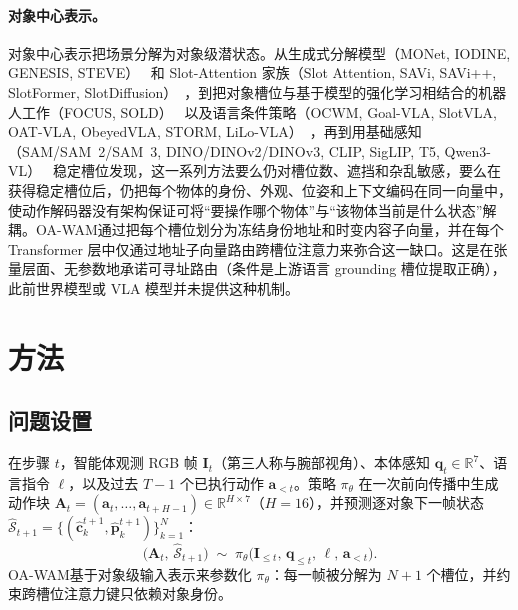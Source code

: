 \documentclass{article}
\newcommand{\method}{OA-WAM}
\begin{document}
\paragraph{对象中心表示。}
对象中心表示把场景分解为对象级潜状态。从生成式分解模型（MONet, IODINE, GENESIS, STEVE）~\citep{monet,iodine,genesis,steve} 和 Slot-Attention 家族（Slot Attention, SAVi, SAVi++, SlotFormer, SlotDiffusion）~\citep{slotattention,savi,savipp,slotformer,slotdiffusion}，到把对象槽位与基于模型的强化学习相结合的机器人工作（FOCUS, SOLD）~\citep{focus,sold} 以及语言条件策略（OCWM, Goal-VLA, SlotVLA, OAT-VLA, ObeyedVLA, STORM, LiLo-VLA）~\citep{ocwm,goalvla,slotvla,oatvla,obeyedvla,storm,lilovla}，再到用基础感知（SAM/SAM~2/SAM~3, DINO/DINOv2/DINOv3, CLIP, SigLIP, T5, Qwen3-VL）~\citep{sam,sam2,sam3,dino,dinov2,dinov3,clip,siglip,t5,qwen3vl} 稳定槽位发现，这一系列方法要么仍对槽位数、遮挡和杂乱敏感，要么在获得稳定槽位后，仍把每个物体的身份、外观、位姿和上下文编码在同一向量中，使动作解码器没有架构保证可将“要操作哪个物体”与“该物体当前是什么状态”解耦。\method{}通过把每个槽位划分为冻结身份地址和时变内容子向量，并在每个 Transformer 层中仅通过地址子向量路由跨槽位注意力来弥合这一缺口。这是在张量层面、无参数地承诺可寻址路由（条件是上游语言 grounding 槽位提取正确），此前世界模型或 VLA 模型并未提供这种机制。

\section{方法}
\label{sec:method}

\subsection{问题设置}
\label{sec:method:setup}

在步骤 $t$，智能体观测 RGB 帧 $\mathbf{I}_t$（第三人称与腕部视角）、本体感知 $\mathbf{q}_t\!\in\!\mathbb{R}^{7}$、语言指令 $\ell$，以及过去 $T{-}1$ 个已执行动作 $\mathbf{a}_{<t}$。策略 $\pi_\theta$ 在一次前向传播中生成动作块 $\mathbf{A}_t\!=\!(\mathbf{a}_t,\dots,\mathbf{a}_{t+H-1})\!\in\!\mathbb{R}^{H\times 7}$（$H{=}16$），并预测逐对象下一帧状态 $\widehat{\mathcal{S}}_{t+1}\!=\!\{(\hat{\mathbf{c}}_k^{t+1},\hat{\mathbf{p}}_k^{t+1})\}_{k=1}^{N}$：
\begin{equation}
\bigl(\mathbf{A}_t,\,\widehat{\mathcal{S}}_{t+1}\bigr)\;\sim\;\pi_\theta\!\bigl(\mathbf{I}_{\le t},\,\mathbf{q}_{\le t},\,\ell,\,\mathbf{a}_{<t}\bigr).
\label{eq:policy}
\end{equation}
\method{}基于对象级输入表示来参数化 $\pi_\theta$：每一帧被分解为 $N{+}1$ 个槽位，并约束跨槽位注意力键只依赖对象身份。
\end{document}
